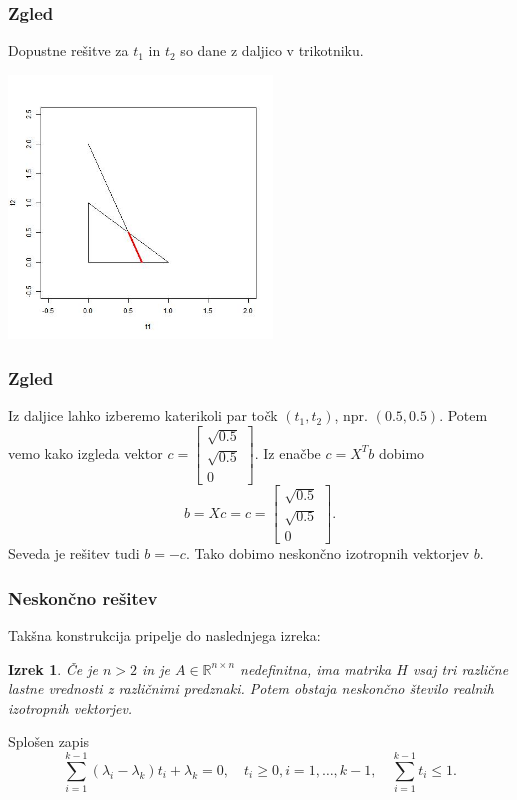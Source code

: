 \documentclass{beamer}
\newcommand{\R}{\mathbb R}
\newtheorem{izrek}{Izrek}
\begin{document}
\begin{frame}
\frametitle{Zgled}
Dopustne rešitve za $t_1$ in $t_2$ so dane z daljico v trikotniku.\pause
\begin{center}
\includegraphics[width=7cm]{graf3.jpg}
\end{center}
\end{frame}
\begin{frame}
\frametitle{Zgled}
Iz daljice lahko izberemo katerikoli par točk $(t_1, t_2)$, npr. $(0.5, 0.5)$. Potem vemo kako izgleda vektor 
$c=\begin{bmatrix}
\sqrt{0.5}\\
\sqrt{0.5}\\
0
\end{bmatrix}$. Iz enačbe $c=X^T b$ dobimo 
$$b=Xc=c =\begin{bmatrix}
\sqrt{0.5}\\
\sqrt{0.5}\\
0
\end{bmatrix}.$$
Seveda je rešitev tudi $b=-c$. Tako dobimo neskončno izotropnih vektorjev $b$.
\end{frame}
\begin{frame}
\frametitle{Neskončno rešitev}
Takšna konstrukcija pripelje do naslednjega izreka:
\begin{izrek}
Če je $n>2$ in je $A\in\R^{n\times n}$ nedefinitna, ima matrika $H$ vsaj tri različne lastne vrednosti z različnimi predznaki. Potem obstaja neskončno število realnih izotropnih vektorjev.
\end{izrek}\pause
\begin{block}{Splošen zapis}
\begin{equation*}
\sum_{i=1}^{k-1} (\lambda_i -\lambda_k)t_i +\lambda_k =0, \quad t_i\ge0,  i=1, \dots,k-1, \quad \sum_{i=1}^{k-1}t_i \le1.
\end{equation*}
\end{block}
\end{frame}
\end{document}
